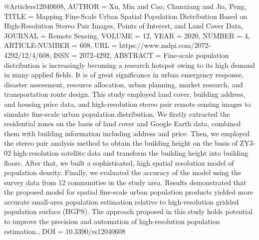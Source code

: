 
@Article{rs12040608,
AUTHOR = {Xu, Min and Cao, Chunxiang and Jia, Peng},
TITLE = {Mapping Fine-Scale Urban Spatial Population Distribution Based on High-Resolution Stereo Pair Images, Points of Interest, and Land Cover Data},
JOURNAL = {Remote Sensing},
VOLUME = {12},
YEAR = {2020},
NUMBER = {4},
ARTICLE-NUMBER = {608},
URL = {https://www.mdpi.com/2072-4292/12/4/608},
ISSN = {2072-4292},
ABSTRACT = {Fine-scale population distribution is increasingly becoming a research hotspot owing to its high demand in many applied fields. It is of great significance in urban emergency response, disaster assessment, resource allocation, urban planning, market research, and transportation route design. This study employed land cover, building address, and housing price data, and high-resolution stereo pair remote sensing images to simulate fine-scale urban population distribution. We firstly extracted the residential zones on the basis of land cover and Google Earth data, combined them with building information including address and price. Then, we employed the stereo pair analysis method to obtain the building height on the basis of ZY3-02 high-resolution satellite data and transform the building height into building floors. After that, we built a sophisticated, high spatial resolution model of population density. Finally, we evaluated the accuracy of the model using the survey data from 12 communities in the study area. Results demonstrated that the proposed model for spatial fine-scale urban population products yielded more accurate small-area population estimation relative to high-resolution gridded population surface (HGPS). The approach proposed in this study holds potential to improve the precision and automation of high-resolution population estimation.},
DOI = {10.3390/rs12040608}
}



